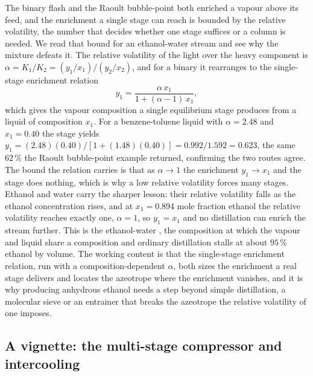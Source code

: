 The binary flash and the Raoult bubble-point both enriched a vapour above its
feed, and the enrichment a single stage can reach is bounded by the relative
volatility, the number that decides whether one stage suffices or a column is
needed. We read that bound for an ethanol-water stream and see why the mixture
defeats it. The relative volatility of the light over the heavy component is
$\alpha = K_1/K_2 = (y_1/x_1)/(y_2/x_2)$, and for a binary it rearranges to the
single-stage enrichment relation
\[
y_1 = \frac{\alpha\,x_1}{1 + (\alpha - 1)\,x_1},
\]
which gives the vapour composition a single equilibrium stage produces from a
liquid of composition $x_1$. For a benzene-toluene liquid with $\alpha = 2.48$
and $x_1 = 0.40$ the stage yields $y_1 = (2.48)(0.40)/[1 + (1.48)(0.40)] =
0.992/1.592 = 0.623$, the same $62\,\%$ the Raoult bubble-point example
returned, confirming the two routes agree. The bound the relation carries is
that as $\alpha \to 1$ the enrichment $y_1 \to x_1$ and the stage does nothing,
which is why a low relative volatility forces many stages. Ethanol and water
carry the sharper lesson: their relative volatility falls as the ethanol
concentration rises, and at $x_1 = 0.894$ mole fraction ethanol the relative
volatility reaches exactly one, $\alpha = 1$, so $y_1 = x_1$ and no
distillation can enrich the stream further. This is the ethanol-water
, the composition at which the vapour and liquid share a
composition and ordinary distillation stalls at about $95\,\%$ ethanol by
volume. The working content is that the single-stage enrichment relation, run
with a composition-dependent $\alpha$, both sizes the enrichment a real stage
delivers and locates the azeotrope where the enrichment vanishes, and it is why
producing anhydrous ethanol needs a step beyond simple distillation, a
molecular sieve or an entrainer that breaks the azeotrope the relative
volatility of one imposes.

\subsection{A vignette: the multi-stage compressor and intercooling}

